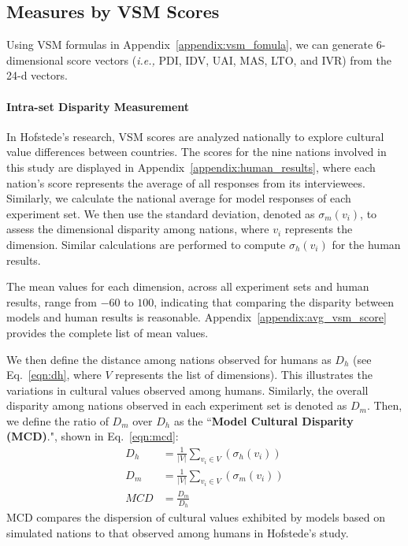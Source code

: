 \documentclass[11pt]{article}
\newcommand{\ie}{\textit{i.e.,}\xspace}
\begin{document}
\subsection{Measures by VSM Scores}
Using VSM formulas in Appendix~\ref{appendix:vsm_fomula}, we can generate 6-dimensional score vectors (\ie PDI, IDV, UAI, MAS, LTO, and IVR) from the 24-d vectors.


\paragraph{Intra-set Disparity Measurement}
\label{sec:intra_set_method}

In Hofstede's research, VSM scores are analyzed nationally to explore cultural value differences between countries. The scores for the nine nations involved in this study are displayed in Appendix~\ref{appendix:human_results}, where each nation's score represents the average of all responses from its interviewees. Similarly, we calculate the national average for model responses of each experiment set. We then use the standard deviation, denoted as $\sigma_m(v_i)$, to assess the dimensional disparity among nations, where $v_i$ represents the dimension. Similar calculations are performed to compute $\sigma_h(v_i)$ for the human results.


The mean values for each dimension, across all experiment sets and human results, range from $-60$ to $100$, indicating that comparing the disparity between models and human results is reasonable. Appendix~\ref{appendix:avg_vsm_score} provides the complete list of mean values.

We then define the distance among nations observed for humans as
$D_h$ (see Eq.~\ref{eqn:dh}, where $V$ represents the list of dimensions). This illustrates the variations in cultural values observed among humans. Similarly, the overall disparity among nations observed in each experiment set is denoted as $D_m$. Then, we define the ratio of $D_m$ over $D_h$ as the ``\textbf{Model Cultural Disparity (MCD)}.", shown in Eq.~\ref{eqn:mcd}:
\begin{align}
    D_h &= \frac{1}{|V|} \sum_{v_i \in V}(\sigma_h(v_i))
    \label{eqn:dh}\\
    D_m &= \frac{1}{|V|} \sum_{v_i \in V}(\sigma_m(v_i))\\
    MCD &= \frac{D_m}{D_h}
    \label{eqn:mcd}
\end{align}
MCD compares the dispersion of cultural values exhibited by models based on simulated nations to that observed among humans in Hofstede's study.
\end{document}
